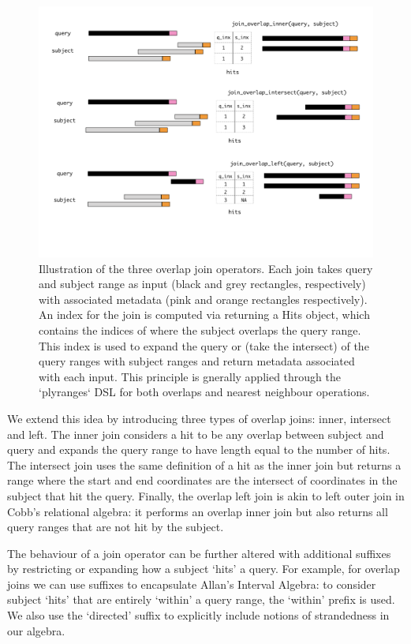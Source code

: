 \documentclass[10pt,letterpaper]{article}
\begin{document}
\begin{figure}

{\centering \includegraphics[width=400pt]{olaps-figure} 

}

\caption{Illustration of the three overlap join operators. Each join takes query and subject range as input (black and grey rectangles, respectively) with associated metadata (pink and orange rectangles respectively). An index for the join is computed via returning a Hits object, which contains the indices of where the subject overlaps the query range. This index is used to expand the query or (take the intersect) of the query ranges with subject ranges and return metadata associated with each input. This principle is gnerally applied through the `plyranges` DSL for both overlaps and nearest neighbour operations.}\label{fig:olaps-fig}
\end{figure}

We extend this idea by introducing three types of overlap joins: inner,
intersect and left. The inner join considers a hit to be any overlap
between subject and query and expands the query range to have length
equal to the number of hits. The intersect join uses the same definition
of a hit as the inner join but returns a range where the start and end
coordinates are the intersect of coordinates in the subject that hit the
query. Finally, the overlap left join is akin to left outer join in
Cobb's relational algebra: it performs an overlap inner join but also
returns all query ranges that are not hit by the subject.

The behaviour of a join operator can be further altered with additional
suffixes by restricting or expanding how a subject `hits' a query. For
example, for overlap joins we can use suffixes to encapsulate Allan's
Interval Algebra: to consider subject `hits' that are entirely `within'
a query range, the `within' prefix is used. We also use the `directed'
suffix to explicitly include notions of strandedness in our algebra.
\end{document}
